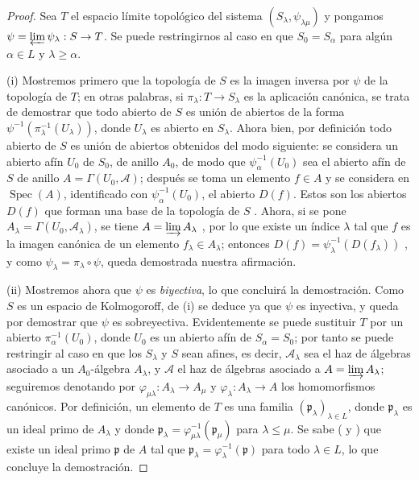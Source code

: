 \begin{proof}
Sea $T$ el espacio límite topológico del sistema $(S_\lambda,\psi_{\lambda\mu})$ y pongamos $\psi=\varprojlim\psi_\lambda:S\to T$.
Se puede restringirnos al caso en que $S_0=S_\alpha$ para algún $\alpha\in L$ y $\lambda\geq\alpha$.

\medskip
\noindent
(i) Mostremos primero que la topología de $S$ es la imagen inversa por $\psi$ de la topología de $T$; en otras palabras, si $\pi_\lambda:T\to S_\lambda$ es la aplicación canónica, se trata de demostrar que todo abierto de $S$ es unión de abiertos de la forma $\psi^{-1}(\pi_\lambda^{-1}(U_\lambda))$, donde $U_\lambda$ es abierto en $S_\lambda$.
Ahora bien, por definición todo abierto de $S$ es unión de abiertos obtenidos del modo siguiente: se considera un abierto afín $U_0$ de $S_0$, de anillo $A_0$, de modo que $\psi_\alpha^{-1}(U_0)$ sea el abierto afín de $S$ de anillo $A=\Gamma(U_0,\mathscr A)$; después se toma un elemento $f\in A$ y se considera en $\operatorname{Spec}(A)$, identificado con $\psi_\alpha^{-1}(U_0)$, el abierto $D(f)$.
Estos son los abiertos $D(f)$ que forman una base de la topología de $S$ .
Ahora, si se pone $A_\lambda=\Gamma(U_0,\mathscr A_\lambda)$, se tiene $A=\varinjlim A_\lambda$ , por lo que existe un índice $\lambda$ tal que $f$ es la imagen canónica de un elemento $f_\lambda\in A_\lambda$; entonces $D(f)=\psi_\lambda^{-1}(D(f_\lambda))$ , y como $\psi_\lambda=\pi_\lambda\circ\psi$, queda demostrada nuestra afirmación.

\medskip
\noindent
(ii) Mostremos ahora que $\psi$ es \emph{biyectiva}, lo que concluirá la demostración.
Como $S$ es un espacio de Kolmogoroff, de (i) se deduce ya que $\psi$ es inyectiva, y queda por demostrar que $\psi$ es sobreyectiva.
Evidentemente se puede sustituir $T$ por un abierto $\pi_\alpha^{-1}(U_0)$, donde $U_0$ es un abierto afín de $S_\alpha=S_0$; por tanto se puede restringir al caso en que los $S_\lambda$ y $S$ sean afines, es decir, $\mathscr A_\lambda$ sea el haz de álgebras asociado a un $A_0$-álgebra $A_\lambda$, y $\mathscr A$ el haz de álgebras asociado a $A=\varinjlim A_\lambda$; seguiremos denotando por $\varphi_{\mu\lambda}:A_\lambda\to A_\mu$ y $\varphi_\lambda:A_\lambda\to A$ los homomorfismos canónicos.
Por definición, un elemento de $T$ es una familia $(\mathfrak p_\lambda)_{\lambda\in L}$, donde $\mathfrak p_\lambda$ es un ideal primo de $A_\lambda$ y donde $\mathfrak p_\lambda=\varphi_{\mu\lambda}^{-1}(\mathfrak p_\mu)$ para $\lambda\leq\mu$.
Se sabe ( y ) que existe un ideal primo $\mathfrak p$ de $A$ tal que $\mathfrak p_\lambda=\varphi_\lambda^{-1}(\mathfrak p)$ para todo $\lambda\in L$, lo que concluye la demostración.
\end{proof}

